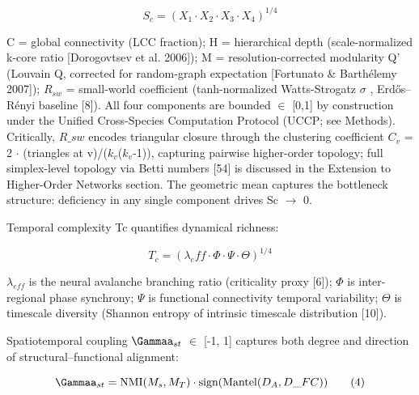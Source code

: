 \documentclass[a4paper,12pt]{article}
\begin{document}
\begin{equation}
S_c = (X_1 \cdot X_2 \cdot X_3 \cdot X_4)^{1/4} \tag{2}
\end{equation}

C = global connectivity (LCC fraction); H = hierarchical depth (scale-normalized k-core ratio [Dorogovtsev et al. 2006]); M = resolution-corrected modularity Q' (Louvain Q, corrected for random-graph expectation [Fortunato \& Barth\'elemy 2007]); $R_{sw}$ = small-world coefficient (tanh-normalized Watts-Strogatz  $\sigma$ , Erd\H{o}s--R\'enyi baseline [8]).
All four components are bounded  $\in$  [0,1] by construction under the Unified Cross-Species Computation Protocol (UCCP; see Methods).
Critically, $R\_{sw}$ encodes triangular closure through the clustering coefficient $C_{v}$ = 2 $\cdot$ (triangles at v)/($k_{v}$($k_{v}$-1)), capturing pairwise higher-order topology; full simplex-level topology via Betti numbers [54] is discussed in the Extension to Higher-Order Networks section.
The geometric mean captures the bottleneck structure: deficiency in any single component drives Sc  $\rightarrow$  0.

Temporal complexity Tc quantifies dynamical richness:

\begin{equation}
T_c = (\lambda_eff \cdot \Phi \cdot \Psi \cdot \Theta)^{1/4} \tag{3}
\end{equation}

$\lambda_{eff}$ is the neural avalanche branching ratio (criticality proxy [6]);  $\Phi$  is inter-regional phase synchrony;  $\Psi$  is functional connectivity temporal variability; $\Theta$ is timescale diversity (Shannon entropy of intrinsic timescale distribution [10]).

Spatiotemporal coupling $\Gammaa_{st}$  $\in$  [-1, 1] captures both degree and direction of structural--functional alignment:

\begin{equation}
\Gammaa_{st} = \text{NMI}(M_s, M_T) \cdot \text{sign}(\text{Mantel}(D_A, D\_{FC})) \tag{4}
\end{equation}
\end{document}
